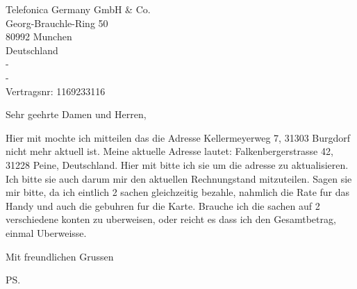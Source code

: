 \documentclass{letter}
\begin{document}
\begin{letter}{Telefonica Germany GmbH & Co. \\ Georg-Brauchle-Ring 50 \\ 80992 Munchen \\ Deutschland \\ -\\ - \\Vertragsnr: 1169233116 \\ }
\opening{Sehr geehrte Damen und Herren, }

Hier mit mochte ich mitteilen das die Adresse Kellermeyerweg 7, 31303 Burgdorf nicht mehr aktuell ist. 
Meine aktuelle Adresse lautet: Falkenbergerstrasse 42, 31228 Peine, Deutschland. 
Hier mit bitte ich sie um die adresse zu aktualisieren.
Ich bitte sie auch darum mir den aktuellen Rechnungstand mitzuteilen. 
Sagen sie mir bitte, da ich eintlich 2 sachen gleichzeitig bezahle, nahmlich die Rate fur das Handy und auch die gebuhren fur die Karte. Brauche ich die sachen auf 2 verschiedene konten zu uberweisen, oder reicht es dass ich den Gesamtbetrag, einmal Uberweisse. 

\closing{Mit freundlichen Grussen}

\ps


\end{letter}
\end{document}
